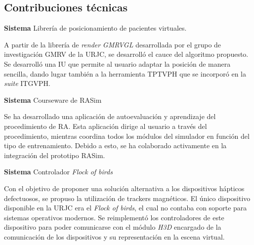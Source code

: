 \subsection{Contribuciones técnicas}
\label{conclu:tecnica}





\textbf{ Sistema } Librería de posicionamiento de pacientes virtuales.

A partir de la librería de \emph{render} \emph{GMRVGL} desarrollada por el grupo de investigación \ac{GMRV} de la \ac{URJC}, se desarrolló el cauce del algoritmo propuesto. Se desarrolló una \ac{IU} que permite al usuario adaptar la posición de manera sencilla, dando lugar también a la herramienta \ac{TPTVPH} que se incorporó en la \emph{suite} \ac{ITGVPH}.

\textbf{ Sistema } Courseware de \ac{RASim}

Se ha desarrollado una aplicación de autoevaluación y aprendizaje del procedimiento de \ac{RA}. Esta aplicación dirige al usuario a través del procedimiento, mientras coordina todos los módulos del simulador en función del tipo de entrenamiento. Debido a esto, se ha colaborado activamente en la integración del prototipo \ac{RASim}.

\textbf{ Sistema } Controlador \emph{Flock of birds} 

Con el objetivo de proponer una solución alternativa a los dispositivos hápticos defectuosos, se propuso la utilización de \acs{tracker}s magnéticos. El único dispositivo disponible en la \ac{URJC} era el \emph{Flock of birds}, el cual no contaba con soporte para sistemas operativos modernos. Se reimplementó los controladores de este dispositivo para poder comunicarse con el módulo \emph{H3D} encargado de la comunicación de los dispositivos y su representación en la escena virtual.


